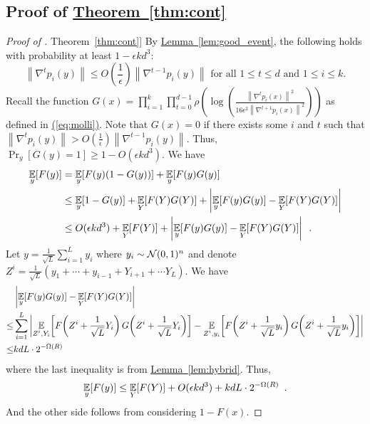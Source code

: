 \documentclass[12pt]{article}
\newcommand{\eq}[1]{\hyperref[eq:#1]{(\ref*{eq:#1})}}
\newcommand{\lem}[1]{\hyperref[lem:#1]{Lemma~\ref*{lem:#1}}}
\newcommand{\thm}[1]{\hyperref[thm:#1]{Theorem~\ref*{thm:#1}}}
\newcommand{\grad}[2]{\nabla^{#1}{#2}}
\newcommand{\br}[1]{\left(#1\right)} \newcommand{\Br}[1]{\left[#1\right]} \newcommand{\st}[1]{\left\{#1\right\}} \newcommand{\tr}[1]{\mathrm{Tr}\!\Br{#1}} \newcommand{\abs}[1]{\left|#1 \right|} \newcommand{\norm}[1]{\left\lVert #1 \right\rVert} \newcommand{\agl}[2]{\theta^{\br{#1}}_{#2}} \newcommand{\aglp}[2]{{\theta'}^{\br{#1}}_{#2}} \newcommand{\lint}[1]{\left\lfloor#1\right\rfloor} \newcommand{\poly}[1]{\mathrm{poly}\!\br{#1}} \newcommand{\negl}[1]{\mathrm{negl}\!\br{#1}} \newcommand{\de}[1]{\mathrm{d}#1} \newcommand{\val}[1]{\mathrm{val}\!\br{#1}} \newcommand{\vall}[1]{\mathrm{val}\br{#1}} \newcommand{\nd}[1]{\mathcal{N}\!\br{#1}} \newcommand{\ketbratwo}[2]{\ket{#1} \hspace{-0.4em}\bra{#2}} \newcommand{\ketbra}[1]{\ketbratwo{#1}{#1}} \newcommand{\id}{\ensuremath{\mathds{1}}} \newcommand{\ogroup}[1]{\mathrm{O}\!\br{#1}} \newcommand{\ugroup}[1]{\mathrm{U}\!\br{#1}} \newcommand{\td}{\mathrm{TD}} \newcommand{\tv}[1]{\norm{#1}_{\mathrm{TV}}} \newcommand {\defeq} {\ensuremath{ \stackrel{\mathrm{def}}{=} }} \newcommand{\vdim}{\ensuremath{N}} \newcommand{\dimin}{\ensuremath{n}} \newcommand{\dimout}{\ensuremath{m}} \newcommand{\ncopy}{\ell} \newcommand{\hspacein}{\H_\mathrm{in}} \newcommand{\hspaceout}{\H_\mathrm{out}} \newcommand{\Sin}{\S(\hspacein)} \newcommand{\Sout}{\S(\hspaceout)} \newcommand{\haar}{\ensuremath{\mu}} \newcommand{\tensorhaar}{\ensuremath{\eta}} \newcommand{\tensorsrss}{\ensuremath{\nu}} \newcommand{\qadvice}{\ensuremath{\rho}} \newcommand{\tp}{\otimes} \newcommand{\wone}[2]{W_1\!\br{#1,#2}}
\begin{document}
\subsection{Proof of \thm{cont}} \label{sec:main}	
\begin{proof}[Proof of \thm{cont}]
	By \lem{good_event}, the following holds with probability at least $1-\epsilon kd^3$:
	\[
		\norm{\grad{t}{p_i(y)}} \leq O\br{\frac{1}{\epsilon}} \norm{\grad{t-1}{p_i(y)}}
		\text{ for all } 1\leq t\leq d \text{ and } 1\leq i\leq k.
	\] 
	Recall the function
	$
		G(x)=\prod_{i=1}^{k} \prod_{t=0}^{d-1} \rho\!\br{\log\!\br{\frac{\norm{\grad{t}{p_i(x)}}^2}{16\epsilon^2 \norm{\grad{t+1}{p_i(x)}}^2 }}}
	$
	as defined in \eq{molli}.
	Note that $G(x) = 0$ if 
	there exists some $i$ and $t$ such that
	$\norm{\grad{t}{p_i(y)}} > O\br{\frac{1}{\epsilon}} \norm{\grad{t-1}{p_i(y)}}$.
	Thus, 
	$ \Pr_{y}[G(y) = 1] \geq 1-O(\epsilon k d^3)$.
	We have
	\begin{align*}
		\expect{y}{F(y)} &= \expect{y}{F(y)(1-G(y))}+\expect{y}{F(y)G(y)} \\
		&\leq \expect{y}{1-G(y)}+\expect{Y}{F(Y)G(Y)} + \abs{ \expect{y}{F(y)G(y)} - \expect{Y}{F(Y)G(Y)} } \\
		&\leq O(\epsilon k d^3)+\expect{Y}{F(Y)} + \abs{ \expect{y}{F(y)G(y)} - \expect{Y}{F(Y)G(Y)} } \enspace.
	\end{align*}
	Let $y = \frac{1}{\sqrt{L}}\sum_{i=1}^L y_i$ where $y_i\sim \mathcal{N}(0,1)^n$ and denote $Z^i =\frac{1}{\sqrt{L}}(y_1 + \cdots +y_{i-1} +Y_{i+1} +\cdots Y_L)$.
	We have
	\begin{align*}
		&\abs{ \expect{y}{F(y)G(y)} - \expect{Y}{F(Y)G(Y)} } \\
		\leq 
		&\sum_{i=1}^{L} \abs{\expect{Z^i,Y_i}{F\!\br{Z^i + \frac{1}{\sqrt{L}}Y_i}G\!\br{Z^i + \frac{1}{\sqrt{L}}Y_i}} - \expect{Z^i,y_i}{F\!\br{Z^i + \frac{1}{\sqrt{L}}y_i}G\!\br{Z^i + \frac{1}{\sqrt{L}}y_i}} }\\
		\leq & kdL\cdot2^{-\Omega(R)}
	\end{align*}
	where the last inequality is from \lem{hybrid}.
	Thus, 
	\begin{align*}
		\expect{y}{F(y)} \leq  \expect{Y}{F(Y)} + O(\epsilon k d^3) + kdL\cdot2^{-\Omega(R)} \enspace.
	\end{align*}
	And the other side follows from considering $1-F(x)$.
\end{proof}
	
	
	
	
	
	
	
\end{document}
